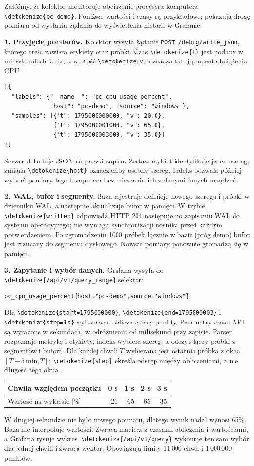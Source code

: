 \documentclass[11pt,a4paper]{article}
\newcommand{\code}[1]{\expandafter\nolinkurl\expandafter{\detokenize{#1}}}
\begin{document}
Załóżmy, że kolektor monitoruje obciążenie procesora komputera
\code{pc-demo}. Poniższe wartości i czasy są przykładowe; pokazują drogę
pomiaru od wysłania żądania do wyświetlenia historii w Grafanie.

\textbf{1. Przyjęcie pomiarów.}
Kolektor wysyła żądanie \texttt{POST /debug/write\_json}, którego treść zawiera
etykiety oraz próbki. Czas \code{t} jest podany w milisekundach Unix,
a wartość \code{v} oznacza tutaj procent obciążenia CPU:
\begin{lstlisting}
[{
  "labels": {"__name__": "pc_cpu_usage_percent",
             "host": "pc-demo", "source": "windows"},
  "samples": [{"t": 1795000000000, "v": 20.0},
              {"t": 1795000001000, "v": 65.0},
              {"t": 1795000003000, "v": 35.0}]
}]
\end{lstlisting}
Serwer dekoduje JSON do paczki zapisu. Zestaw etykiet identyfikuje jeden szereg;
zmiana \code{host} oznaczałaby osobny szereg. Indeks pozwala później wybrać
pomiary tego komputera bez mieszania ich z danymi innych urządzeń.

\textbf{2. WAL, bufor i segmenty.}
Baza rejestruje definicję nowego szeregu i próbki w dzienniku WAL,
a następnie aktualizuje bufor w pamięci. W trybie \code{written} odpowiedź
HTTP 204 następuje po zapisaniu WAL do systemu operacyjnego; nie wymaga
synchronizacji nośnika przed każdym potwierdzeniem. Po zgromadzeniu 1000 próbek
łącznie w bazie (próg demo) bufor jest zrzucany do segmentu dyskowego.
Nowsze pomiary ponownie gromadzą się w pamięci.

\textbf{3. Zapytanie i wybór danych.}
Grafana wysyła do \code{/api/v1/query_range} selektor:
\begin{lstlisting}
pc_cpu_usage_percent{host="pc-demo",source="windows"}
\end{lstlisting}
Dla \code{start=1795000000}, \code{end=1795000003} i \code{step=1s}
wykonawca oblicza cztery punkty. Parametry czasu API są wyrażone w sekundach,
w odróżnieniu od milisekund przy zapisie. Parser rozpoznaje metrykę i etykiety,
indeks wybiera szereg, a odczyt łączy próbki z segmentów i bufora.
Dla każdej chwili $T$ wybierana jest ostatnia próbka z okna
$[T-5\,\mathrm{min},T]$; \code{step} określa odstęp między obliczeniami,
a nie długość tego okna.

\begin{center}
	\begin{tabular}{lrrrr}
		\toprule
		Chwila względem początku & 0 s & 1 s & 2 s & 3 s \\ \midrule
		Wartość na wykresie [\%] & 20  & 65  & 65  & 35  \\ \bottomrule
	\end{tabular}
\end{center}
W drugiej sekundzie nie było nowego pomiaru, dlatego wynik nadal wynosi 65\%.
Baza nie interpoluje wartości. Zwraca macierz z czasami obliczenia i wartościami,
a Grafana rysuje wykres. \mbox{\code{/api/v1/query}} wykonuje ten sam wybór dla jednej
chwili i zwraca wektor. Obowiązują limity 11\,000 chwil i 1\,000\,000 punktów.
\end{document}
